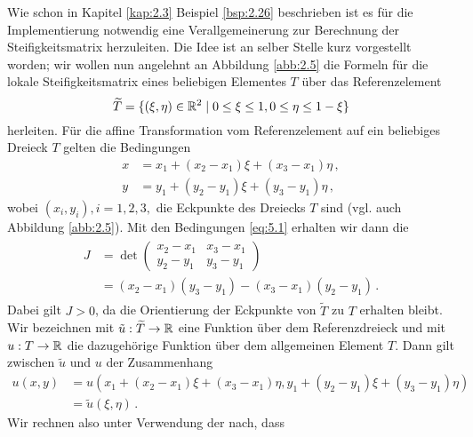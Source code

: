 Wie schon in Kapitel \ref{kap:2.3} Beispiel \ref{bsp:2.26} beschrieben ist es für die Implementierung notwendig eine Verallgemeinerung zur Berechnung der Steifigkeitsmatrix herzuleiten. Die Idee ist an selber Stelle kurz vorgestellt worden; wir wollen nun angelehnt an Abbildung \ref{abb:2.5} die Formeln für die lokale Steifigkeitsmatrix eines beliebigen Elementes $T$ über das Referenzelement
\[
	\widetilde T = \{(\xi ,\eta)\in \mathbb{R}^2\mid 0\le \xi \le 1, 0\le \eta \le 1-\xi\}
\]
herleiten. Für die affine Transformation vom Referenzelement auf ein beliebiges Dreieck $T$ gelten die Bedingungen
\begin{subequations}\label{eq:5.1}
\begin{align}\label{eq:5.1a}
	x & = x_1 + (x_2-x_1)\xi + (x_3-x_1) \eta \, ,\\
	\label{eq:5.1b}
	y & = y_1 + (y_2-y_1)\xi + (y_3-y_1)\eta \, ,
\end{align}
\end{subequations}
wobei $(x_i,y_i),i=1,2,3,$ die Eckpunkte des Dreiecks $T$ sind (vgl. auch Abbildung \ref{abb:2.5}). Mit den Bedingungen \eqref{eq:5.1} erhalten wir dann die 
\begin{align}\label{eq:5.2}
\begin{aligned}
	J & = \det \begin{pmatrix}
				x_2-x_1 & x_3-x_1 \\
				y_2-y_1 & y_3-y_1
			\end{pmatrix}  \\
			& = (x_2-x_1)(y_3-y_1) - (x_3-x_1)(y_2-y_1)\, .
\end{aligned}
\end{align}
Dabei gilt $J>0$, da die Orientierung der Eckpunkte von $\widetilde T$ zu $T$ erhalten bleibt. Wir bezeichnen mit $\tilde u : \widetilde T \rightarrow \mathbb{R}$ eine Funktion über dem Referenzdreieck und mit $u:T\rightarrow \mathbb{R}$ die dazugehörige Funktion über dem allgemeinen Element $T$. Dann gilt zwischen $\tilde u $ und $u$ der Zusammenhang
\begin{align*}
	u(x,y) & = u(x_1 + (x_2-x_1)\xi + (x_3-x_1) \eta, y_1 + (y_2-y_1)\xi + (y_3-y_1)\eta) \\
	& =\tilde u(\xi,\eta) \, .
\end{align*}
Wir rechnen also unter Verwendung der  nach, dass
